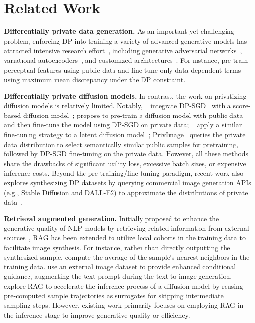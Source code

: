 
\section{Related Work}

{\bf Differentially private data generation.} As an important yet challenging problem, enforcing DP into training a variety of advanced generative models has attracted intensive research effort~\citep{sok}, including generative adversarial networks~\citep{gan,gs-wgan,pate-gan}, variational autoencoders~\citep{jiang2022dp2vae}, and customized architectures~\citep{liew2022pearl,vinaroz2022hermite,harder2021dpmerf}. For instance, \citet{harder2023pretrained} pre-train perceptual features using public data and fine-tune only data-dependent terms using maximum mean discrepancy under the DP constraint. 

{\bf Differentially private diffusion models.} In contrast, the work on privatizing diffusion models is relatively limited. Notably, \dpdm~\citep{dockhorn2022differentially} integrate DP-SGD~\citep{abadi2016deep} with a score-based diffusion model~\citep{song2021scorebased}; \citet{ghalebikesabi2023differentially} propose to pre-train a diffusion model with public data and then fine-tune the model using DP-SGD on private data; \dpldm~\citep{lyu2023differentially} apply a similar fine-tuning strategy to a latent diffusion model~\citep{rombach2022high}; PrivImage~\citep{privimage} queries the private data distribution to select semantically similar public samples for pretraining, followed by DP-SGD fine-tuning on the private data. However, all these methods share the drawbacks of significant utility loss, excessive batch sizes, or expensive inference costs. Beyond the pre-training/fine-tuning paradigm, recent work also explores synthesizing DP datasets by querying commercial image generation APIs (e.g., Stable Diffusion and DALL-E2) to approximate the distributions of private data~\citep{wangdp,dpsda}. 


{\bf Retrieval augmented generation.} Initially proposed to enhance the generative quality of NLP models by retrieving related information from external sources~\cite{khandelwal2019generalization,lewis2020retrieval,guu2020retrieval}, RAG has been extended to utilize local cohorts in the training data to facilitate image synthesis. For instance, rather than directly outputting the synthesized sample, \citet{casanova2021instance} compute the average of the sample's nearest neighbors in the training data. \citet{blattmann2022retrieval} use an external image dataset to provide enhanced conditional guidance, augmenting the text prompt during the text-to-image generation. \cite{zhang2023redi} explore RAG to accelerate the inference process of a diffusion model by reusing pre-computed sample trajectories as surrogates for skipping intermediate sampling steps. However, existing work primarily focuses on employing RAG in the inference stage to improve generative quality or efficiency.

